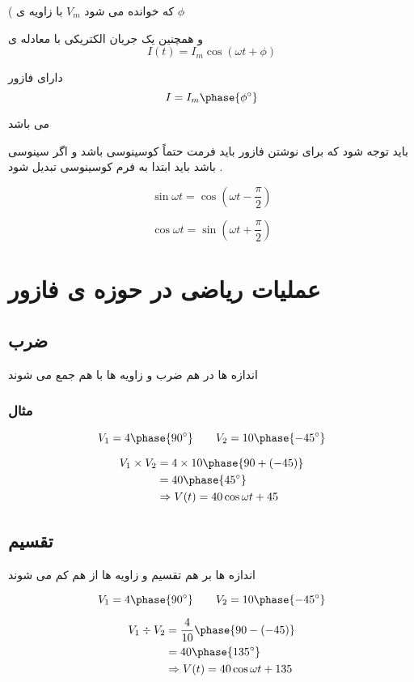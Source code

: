 \documentclass[12pt]{book}
\begin{document}
( که خوانده می شود 
$V_{m}$
با زاویه ی
$\phi$


و همچنین یک جریان الکتریکی با معادله ی 
$$
I(t) = I_{m} \cos{( \omega t + \phi )}
$$

دارای فازور 
$$
I = I_{m} \phase{\phi^{\circ}}
$$

می باشد 


باید توجه شود که برای نوشتن فازور باید فرمت حتماً کوسینوسی باشد و اگر سینوسی باشد باید ابتدا به فرم کوسینوسی تبدیل شود .

$$
\sin{\omega t} = \cos{(\omega t - \frac{\pi}{2})}
$$

$$
\cos{\omega t} = \sin{(\omega t + \frac{\pi}{2})}
$$



\section{عملیات ریاضی در حوزه ی فازور}


\subsection{ضرب}

اندازه ها در هم ضرب و زاویه ها با هم جمع می شوند 

\subsubsection{مثال}

$$
V_{1} = 4 \phase{90^{\circ}} \qquad V_{2} = 10 \phase{-45^{\circ}}
$$


\begin{align*}
V_{1} \times V_{2} &= 4 \times 10 \phase{90 + ( - 45 )} \\
&= 40 \phase{45^{\circ}} \\
&\Rightarrow V(t) = 40 \cos{\omega t + 45}
\end{align*}


\subsection{تقسیم}

اندازه ها بر هم تقسیم و زاویه ها از هم کم می شوند 


$$
V_{1} = 4 \phase{90^{\circ}} \qquad V_{2} = 10 \phase{- 45^{\circ}}
$$

\begin{align*}
V_{1} \div V_{2} &= \frac{4}{10} \phase{90 - ( - 45 )} \\
&= 40 \phase{135^{\circ}} \\
&\Rightarrow V(t) = 40 \cos{\omega t + 135}
\end{align*}
\end{document}
